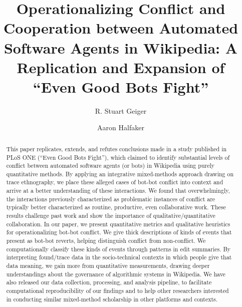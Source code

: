 \documentclass[format=acmsmall, review=false, screen=true]{acmart}%
\begin{document}
\title[Operationalizing Conflict \& Coordination Between Automated Software Agents]{Operationalizing Conflict and Cooperation between Automated Software Agents in Wikipedia: A Replication and Expansion of ``Even Good Bots Fight''}

\author{R. Stuart Geiger}
\author{Aaron Halfaker}
\authorsaddresses{}
\begin{abstract}
This paper replicates, extends, and refutes conclusions made in a study published in PLoS ONE (``Even Good Bots Fight''), which claimed to identify substantial levels of conflict between automated software agents (or bots) in Wikipedia using purely quantitative methods. By applying an integrative mixed-methods approach drawing on trace ethnography, we place these alleged cases of bot-bot conflict into context and arrive at a better understanding of these interactions. We found that overwhelmingly, the interactions previously characterized as problematic instances of conflict are typically better characterized as routine, productive, even collaborative work. These results challenge past work and show the importance of qualitative/quantitative collaboration. In our paper, we present quantitative metrics and qualitative heuristics for operationalizing bot-bot conflict. We give thick descriptions of kinds of events that present as bot-bot reverts, helping distinguish conflict from non-conflict. We computationally classify these kinds of events through patterns in edit summaries. By interpreting found/trace data in the socio-technical contexts in which people give that data meaning, we gain more from quantitative measurements, drawing deeper understandings about the governance of algorithmic systems in Wikipedia. We have also released our data collection, processing, and analysis pipeline, to facilitate computational reproducibility of our findings and to help other researchers interested in conducting similar mixed-method scholarship in other platforms and contexts.
\end{abstract}
\end{document}
